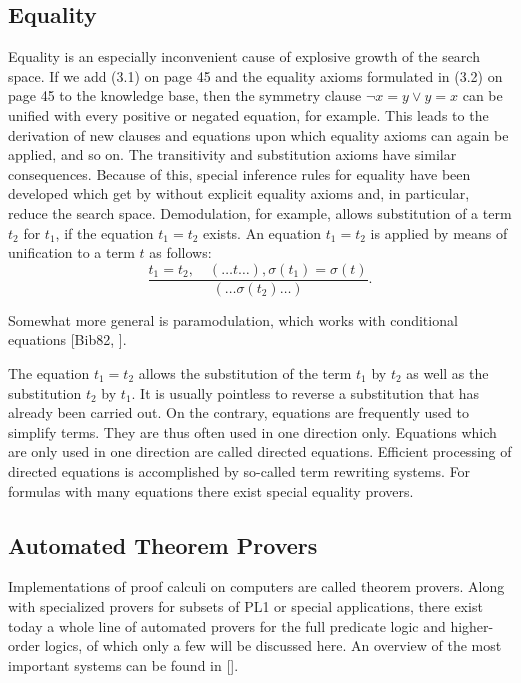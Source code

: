 \documentclass[10pt]{book}
\begin{document}
\subsection{Equality}
Equality is an especially inconvenient cause of explosive growth of the search space. If we add (3.1) on page 45 and the equality axioms formulated in (3.2) on page 45 to the knowledge base, then the symmetry clause $\neg x=y \vee y=x$ can be unified with every positive or negated equation, for example. This leads to the derivation of new clauses and equations upon which equality axioms can again be applied, and so on. The transitivity and substitution axioms have similar consequences. Because of this, special inference rules for equality have been developed which get by without explicit equality axioms and, in particular, reduce the search space. Demodulation, for example, allows substitution of a term $t_{2}$ for $t_{1}$, if the equation $t_{1}=t_{2}$ exists. An equation $t_{1}=t_{2}$ is applied by means of unification to a term $t$ as follows:
$$
\frac{t_{1}=t_{2}, \quad(\ldots t \ldots), \sigma\left(t_{1}\right)=\sigma(t)}{\left(\ldots \sigma\left(t_{2}\right) \ldots\right)} .
$$

Somewhat more general is paramodulation, which works with conditional equations [Bib82, \cite{lov78}].

The equation $t_{1}=t_{2}$ allows the substitution of the term $t_{1}$ by $t_{2}$ as well as the substitution $t_{2}$ by $t_{1}$. It is usually pointless to reverse a substitution that has already been carried out. On the contrary, equations are frequently used to simplify terms. They are thus often used in one direction only. Equations which are only used in one direction are called directed equations. Efficient processing of directed equations is accomplished by so-called term rewriting systems. For formulas with many equations there exist special equality provers.

\subsection{Automated Theorem Provers}
Implementations of proof calculi on computers are called theorem provers. Along with specialized provers for subsets of PL1 or special applications, there exist today a whole line of automated provers for the full predicate logic and higher-order logics, of which only a few will be discussed here. An overview of the most important systems can be found in [\cite{mcc}].
\end{document}
